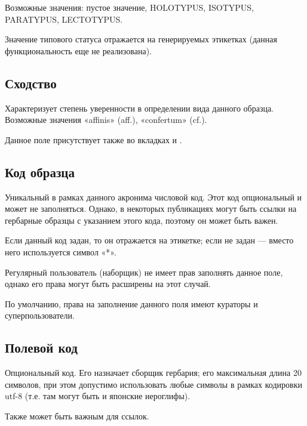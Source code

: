 \documentclass[letterpaper,10pt,russian]{sphinxmanual}
\begin{document}
Возможные значения: пустое значение, HOLOTYPUS, ISOTYPUS, PARATYPUS, LECTOTYPUS.

Значение типового статуса отражается на генерируемых этикетках
(данная функциональность еще не реализована).

\ignorespaces 

\subsection{Сходство}
\label{\detokenize{main:index-13}}\label{\detokenize{main:id18}}
Характеризует степень уверенности в определении вида данного образца.
Возможные значения «affinis» (aff.), «confertum» (cf.).

Данное поле присутствует также во вкладках {\hyperref[\detokenize{main:id37}]{}} и {\hyperref[\detokenize{main:id38}]{}}.

\ignorespaces 

\subsection{Код образца}
\label{\detokenize{main:id19}}\label{\detokenize{main:index-14}}
Уникальный в рамках данного акронима числовой код. Этот код опциональный и может не заполняться.
Однако, в некоторых публикациях могут быть ссылки на гербарные образцы с
указанием этого кода, поэтому он может быть важен.

Если данный код задан, то он отражается на этикетке; если не задан — вместо него используется символ «*».

Регулярный пользователь (наборщик) не имеет прав заполнять данное поле,
однако его права могут быть расширены на этот случай.

По умолчанию, права на заполнение данного поля имеют кураторы и суперпользователи.

\ignorespaces 

\subsection{Полевой код}
\label{\detokenize{main:index-15}}\label{\detokenize{main:id20}}
Опциональный код. Его назначает сборщик гербария; его максимальная длина 20 символов,
при этом допустимо использовать любые символы в рамках кодировки utf-8
(т.е. там могут быть и японские иероглифы).

Также может быть важным для ссылок.
\end{document}
